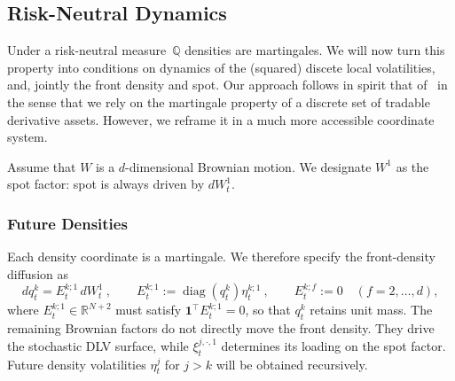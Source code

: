 \documentclass[11pt]{article}
\newcommand{\Q}{\mathbb Q}
\newcommand{\one}{\mathbf 1}
\theoremstyle{plain}
\theoremstyle{definition}
\theoremstyle{remark}
\begin{document}
\subsection{Risk-Neutral Dynamics}

Under a risk-neutral measure~$\Q$ densities are martingales. We will now turn this property into conditions on dynamics of the (squared) discete local volatilities, and, 
jointly the front density and spot. 
Our approach follows in spirit that of~\cite{Wissel2007} in the sense that we rely on the martingale property of a discrete set of tradable derivative assets.
However, we reframe it in a much more accessible coordinate system.

Assume that $W$ is a $d$-dimensional Brownian motion. We designate $W^1$ as the
spot factor: spot is always driven by $dW_t^1$.

\subsubsection{Future Densities}
\label{sec:future-densities}

Each density coordinate
is a martingale. We therefore specify the front-density diffusion as
\[
dq_t^k=E_t^{k;1}\,dW_t^1 \ ,
\qquad
E_t^{k;1}:=\operatorname{diag}(q_t^k)\eta_t^{k;1} \ ,
\qquad E_t^{k;f}:=0\quad(f=2,\ldots,d),
\]
where $E_t^{k;1}\in\mathbb R^{N+2}$ must satisfy
$\one^{\!\top}E_t^{k;1}=0$, so that $q_t^k$ retains unit mass. The
remaining Brownian factors do not directly move the front density. They
drive the stochastic DLV surface, while $\xi_t^{j,\cdot,1}$ determines its loading on the spot factor.
Future density volatilities $\eta_t^j$ for $j>k$ will be obtained recursively.
\end{document}

